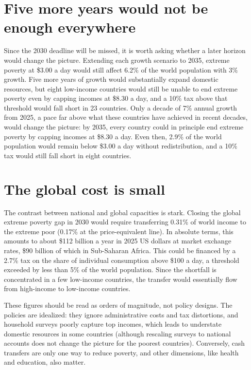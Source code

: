 \documentclass[11pt,english]{article}
\begin{document}
\section*{Five more years would not be enough everywhere}

Since the 2030 deadline will be missed, it is worth asking whether a later horizon would change the picture. Extending each growth scenario to 2035, extreme poverty at \$3.00 a day would still affect 6.2\% of the world population with 3\% growth. Five more years of growth would substantially expand domestic resources, but eight low-income countries would still be unable to end extreme poverty even by capping incomes at \$8.30 a day, and a 10\% tax above that threshold would fall short in 23 countries. Only a decade of 7\% annual growth from 2025, a pace far above what these countries have achieved in recent decades, would change the picture: by 2035, every country could in principle end extreme poverty by capping incomes at \$8.30 a day. Even then, 2.9\% of the world population would remain below \$3.00 a day without redistribution, and a 10\% tax would still fall short in eight countries.

\section*{The global cost is small}

The contrast between national and global capacities is stark. Closing the global extreme poverty gap in 2030 would require transferring 0.31\% of world income to the extreme poor (0.17\% at the price-equivalent line). In absolute terms, this amounts to about \$112 billion a year in 2025 US dollars at market exchange rates, \$90 billion of which in Sub-Saharan Africa. This could be financed by a 2.7\% tax on the share of individual consumption above \$100 a day, a threshold exceeded by less than 5\% of the world population. Since the shortfall is concentrated in a few low-income countries, the transfer would essentially flow from high-income to low-income countries.

These figures should be read as orders of magnitude, not policy designs. The policies are idealized: they ignore administrative costs and tax distortions, and household surveys poorly capture top incomes, which leads to understate domestic resources in some countries (although rescaling surveys to national accounts does not change the picture for the poorest countries). Conversely, cash transfers are only one way to reduce poverty, and other dimensions, like health and education, also matter.
\end{document}
